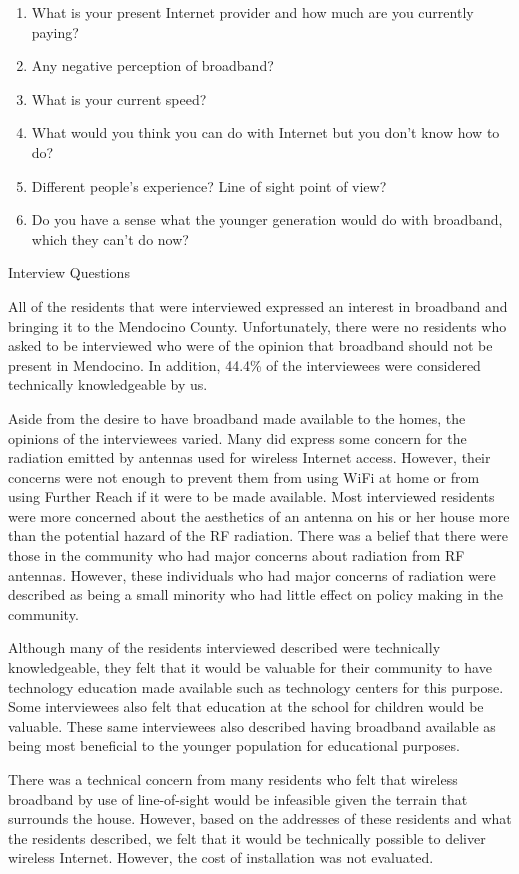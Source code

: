 \begin{table}
\begin{enumerate}
    \item What is your present Internet provider and how much are you currently paying?
    \item Any negative perception of broadband?
    \item What is your current speed?
    \item What would you think you can do with Internet but you don’t know how to do?
    \item Different people’s experience? Line of sight point of view?
    \item Do you have a sense what the younger generation would do with broadband, which they can’t do now?
\end{enumerate}
\caption{Interview Questions}
\label{tab:questions}
\end{table}

All of the residents that were interviewed expressed an interest in broadband and bringing it
to the Mendocino County. Unfortunately, there were no residents who asked to be interviewed who
were of the opinion that broadband should not be present in Mendocino. In addition, 44.4\% of
the interviewees were considered technically knowledgeable by us.

Aside from the desire to have broadband made available to the homes, the opinions of the
interviewees varied. Many did express some concern for the radiation emitted by antennas
used for wireless Internet access. However, their concerns were not enough to prevent them
from using WiFi at home or from using Further Reach if it were to be made available.
Most interviewed residents were more concerned about the aesthetics of an antenna on his or her
house more than the potential hazard of the RF radiation.
There was a belief that there were those in the community who had major concerns about radiation
from RF antennas. However, these individuals who had major concerns of radiation were described
as being a small minority who had little effect on policy making in the community.

Although many of the residents interviewed described were technically knowledgeable, they felt
that it would be valuable for their community to have technology education made available such
as technology centers for this purpose. Some interviewees also felt that education at the school
for children would be valuable. These same interviewees also described having broadband available
as being most beneficial to the younger population for educational purposes.

There was a technical concern from many residents who felt that wireless broadband by use of
line-of-sight would be infeasible given the terrain that surrounds the house. However, based
on the addresses of these residents and what the residents described, we felt
that it would be technically possible to deliver wireless Internet. However, the cost of
installation was not evaluated.

